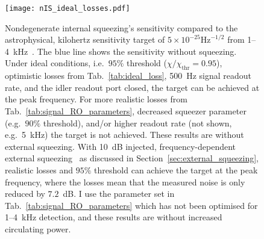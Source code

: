 \begin{figure}
    \centering
    \texttt{[image: nIS\_ideal\_losses.pdf]}
    \caption{  Nondegenerate internal squeezing's sensitivity compared to the astrophysical, kilohertz sensitivity target of $5\times10^{-25}\text{Hz}^{-1/2}$ from 1--4~kHz~\cite{miaoDesignGravitationalWaveDetectors2018}. The blue line shows the sensitivity without squeezing. Under ideal conditions, i.e.\ $95\%$ threshold ($\chi/\chi_\text{thr}=0.95$), optimistic losses from Tab.~\ref{tab:ideal_loss}, 500~Hz signal readout rate, and the idler readout port closed, the target can be achieved at the peak frequency. For more realistic losses from Tab.~\ref{tab:signal_RO_parameters}, decreased squeezer parameter (e.g.\ $90\%$ threshold), and/or higher readout rate (not shown, e.g.\ 5~kHz) the target is not achieved. These results are without external squeezing. With 10~dB injected, frequency-dependent external squeezing~\cite{} as discussed in Section~\ref{sec:external_squeezing}, realistic losses and $95\%$ threshold can achieve the target at the peak frequency, where the losses mean that the measured noise is only reduced by $7.2$~dB.
    I use the parameter set in Tab.~\ref{tab:signal_RO_parameters} which has not been optimised for 1--4~kHz detection, and these results are without increased circulating power.}
    \label{fig:nIS_sens_target}
\end{figure}

